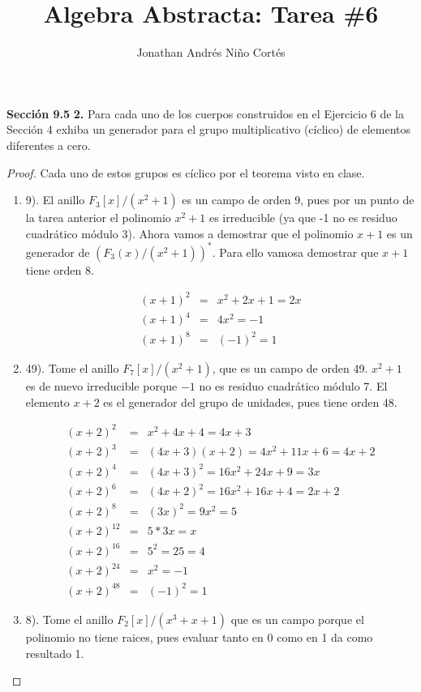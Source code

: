 \documentclass[letter,twoside,12pt]{article}
\title{Algebra Abstracta: Tarea \#6}
\author{Jonathan Andrés Niño Cortés}
\begin{document}
\maketitle
\textbf{Sección 9.5} \textbf{2.} Para cada uno de los cuerpos construidos en el Ejercicio 6 de la Sección 4 exhiba un generador para el grupo multiplicativo (cíclico) de elementos diferentes a cero.

\begin{proof}
Cada uno de estos grupos es cíclico por el teorema visto en clase.
\begin{enumerate}[label=\textbf{(\alph*)}]
\item 9). El anillo $ F_3[x]/(x^2+1) $ es un campo de orden 9, pues por un punto de la tarea anterior el polinomio $ x^2+1 $ es irreducible (ya que -1 no es residuo cuadrático módulo 3). Ahora vamos a demostrar que el polinomio $ x+1 $ es un generador de $ (F_3(x)/(x^2+1))^* $. Para ello vamosa demostrar que $ x+1 $ tiene orden 8.

\begin{eqnarray}
(x+1)^2 &=& x^2+2x+1 = 2x  \nonumber 
\\(x+1)^4 &=& 4x^2 = -1 \nonumber
\\(x+1)^8 &=& (-1)^2 = 1 \nonumber
\end{eqnarray}

\item 49). Tome el anillo $ F_7[x]/(x^2+1) $, que es un campo de orden 49. $ x^2+1 $ es de nuevo irreducible porque $ -1 $ no es residuo cuadrático módulo 7. El elemento $ x+2 $ es el generador del grupo de unidades, pues tiene orden 48.

\begin{eqnarray}
(x+2)^2 &=& x^2+4x+4 = 4x+3 \nonumber
\\(x+2)^3 &=& (4x+3)(x+2)=4x^2+11x+6=4x+2 \nonumber
\\(x+2)^4 &=& (4x+3)^2=16x^2+24x+9 = 3x \nonumber
\\(x+2)^6 &=& (4x+2)^2=16x^2+16x+4 = 2x+2 \nonumber
\\(x+2)^8 &=& (3x)^2=9x^2 = 5 \nonumber
\\(x+2)^{12} &=& 5*3x = x\nonumber
\\(x+2)^{16} &=& 5^2=25=4 \nonumber
\\(x+2)^{24} &=& x^2 = -1\nonumber
\\(x+2)^{48} &=& (-1)^2 = 1\nonumber
\end{eqnarray}
\item 8). Tome el anillo $ F_2[x]/(x^3+x+1) $ que es un campo porque el polinomio no tiene raices, pues evaluar tanto en 0 como en 1 da como resultado 1.


\end{enumerate}
\end{proof}
\end{document}
